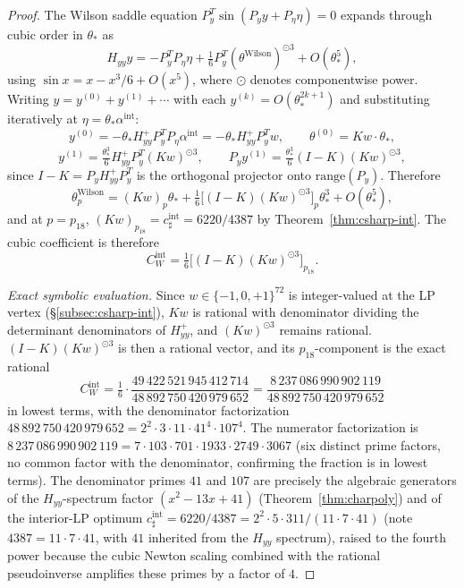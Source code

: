 \documentclass[11pt]{article}
\theoremstyle{definition}
\begin{document}
\begin{proof}
The Wilson saddle equation $P_y^T\sin(P_y y+P_\eta\eta)=0$ expands
through cubic order in $\theta_*$ as
\[
H_{yy}y=-P_y^T P_\eta\eta+\tfrac{1}{6}P_y^T(\theta^{\mathrm{Wilson}})^{\odot 3}+O(\theta_*^5),
\]
using $\sin x=x-x^3/6+O(x^5)$, where $\odot$ denotes componentwise
power.  Writing $y=y^{(0)}+y^{(1)}+\cdots$ with each
$y^{(k)}=O(\theta_*^{2k+1})$ and substituting iteratively at
$\eta=\theta_*\alpha^{\mathrm{int}}$:
\[
y^{(0)}=-\theta_*H_{yy}^+ P_y^T P_\eta\alpha^{\mathrm{int}}=-\theta_*H_{yy}^+ P_y^T w,\qquad
\theta^{(0)}=Kw\cdot\theta_*,
\]
\[
y^{(1)}=\tfrac{\theta_*^3}{6}H_{yy}^+ P_y^T(Kw)^{\odot 3},\qquad
P_y y^{(1)}=\tfrac{\theta_*^3}{6}(I-K)(Kw)^{\odot 3},
\]
since $I-K=P_y H_{yy}^+ P_y^T$ is the orthogonal projector onto
$\mathrm{range}(P_y)$.  Therefore
\[
\theta^{\mathrm{Wilson}}_p=(Kw)_p\theta_*+\tfrac{1}{6}\bigl[(I-K)(Kw)^{\odot 3}\bigr]_p\theta_*^3+O(\theta_*^5),
\]
and at $p=p_{18}$, $(Kw)_{p_{18}}=c_\sharp^{\mathrm{int}}=6220/4387$
by Theorem~\ref{thm:csharp-int}.  The cubic coefficient is therefore
\[
C_W^{\mathrm{int}}=\tfrac{1}{6}\bigl[(I-K)(Kw)^{\odot 3}\bigr]_{p_{18}}.
\]

\emph{Exact symbolic evaluation.}
Since $w\in\{-1,0,+1\}^{72}$ is integer-valued at the LP vertex
\textup{(}\S\ref{subsec:csharp-int}\textup{)}, $Kw$ is rational with
denominator dividing the determinant denominators of $H_{yy}^+$, and
$(Kw)^{\odot 3}$ remains rational.  $(I-K)(Kw)^{\odot 3}$ is then a
rational vector, and its $p_{18}$-component is the exact rational
\[
C_W^{\mathrm{int}}=\tfrac{1}{6}\cdot\frac{49\,422\,521\,945\,412\,714}{48\,892\,750\,420\,979\,652}
=\frac{8\,237\,086\,990\,902\,119}{48\,892\,750\,420\,979\,652}
\]
in lowest terms, with the denominator factorization
$48\,892\,750\,420\,979\,652=2^2\cdot 3\cdot 11\cdot 41^4\cdot 107^4$.
The numerator factorization is
$8\,237\,086\,990\,902\,119=7\cdot 103\cdot 701\cdot 1933\cdot 2749\cdot 3067$
\textup{(}six distinct prime factors, no common factor with the
denominator, confirming the fraction is in lowest terms\textup{)}.
The denominator primes $41$ and $107$ are precisely the algebraic
generators of the $H_{yy}$-spectrum factor
$(x^2-13x+41)$ \textup{(}Theorem~\ref{thm:charpoly}\textup{)} and of
the interior-LP optimum $c_\sharp^{\mathrm{int}}=6220/4387=2^2\cdot 5\cdot 311/(11\cdot 7\cdot 41)$
\textup{(}note $4387=11\cdot 7\cdot 41$, with $41$ inherited from the
$H_{yy}$ spectrum\textup{)}, raised to the fourth power because the
cubic Newton scaling combined with the rational pseudoinverse
amplifies these primes by a factor of $4$.


\end{proof}
\end{document}
